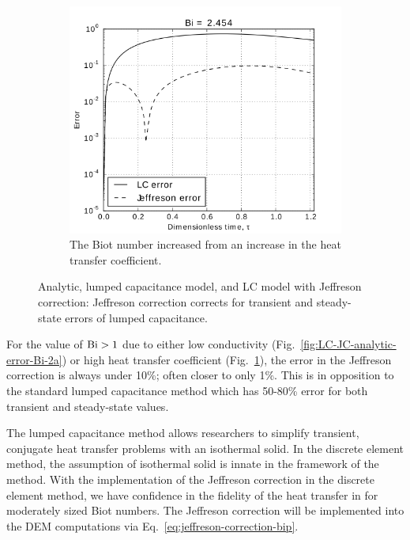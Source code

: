 \begin{figure}
        \begin{subfigure}[b]{0.65\textwidth}
                \includegraphics[width=\textwidth]{chapters/figures/LC-JC-analytic-error-Bi-2b}
                \caption{The Biot number increased from  an increase in the heat transfer coefficient.}
				\label{fig:LC-JC-analytic-error-Bi-2b}
        \end{subfigure}
        \caption[Jeffreson correction for moderate Biot number based on conductivity]{Analytic, lumped capacitance model, and LC model with Jeffreson correction: Jeffreson correction corrects for transient and steady-state errors of lumped capacitance.}\label{fig:LC-JC-analytic-error-Bi-2}
\end{figure}

For the value of $\mathrm{Bi} > 1$ due to either low conductivity (Fig.~\ref{fig:LC-JC-analytic-error-Bi-2a}) or high heat transfer coefficient (Fig.~\ref{fig:LC-JC-analytic-error-Bi-2b}), the error in the Jeffreson correction is always under 10\%; often closer to only 1\%. This is in opposition to the standard lumped capacitance method which has 50-80\% error for both transient and steady-state values.

The lumped capacitance method allows researchers to simplify transient, conjugate heat transfer problems with an isothermal solid. In the discrete element method, the assumption of isothermal solid is innate in the framework of the method. With the implementation of the Jeffreson correction in the discrete element method, we have confidence in the fidelity of the heat transfer in for moderately sized Biot numbers. The Jeffreson correction will be implemented into the DEM computations via Eq.~\ref{eq:jeffreson-correction-bip}. 
